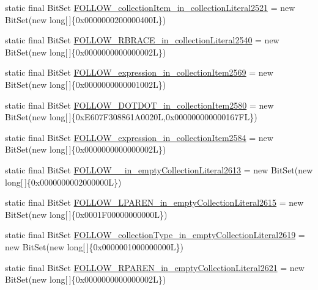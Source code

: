 \begin{DoxyCompactItemize}
static final Bit\-Set \hyperlink{classorg_1_1tzi_1_1use_1_1parser_1_1ocl_1_1_o_c_l_parser_a3ec9d882ee2519c44e78bc1fab0a7ae5}{F\-O\-L\-L\-O\-W\-\_\-collection\-Item\-\_\-in\-\_\-collection\-Literal2521} = new Bit\-Set(new long\mbox{[}$\,$\mbox{]}\{0x0000000200000400\-L\})
\item 
static final Bit\-Set \hyperlink{classorg_1_1tzi_1_1use_1_1parser_1_1ocl_1_1_o_c_l_parser_a4f970adb9c629bdc5afa0567d67b7e56}{F\-O\-L\-L\-O\-W\-\_\-\-R\-B\-R\-A\-C\-E\-\_\-in\-\_\-collection\-Literal2540} = new Bit\-Set(new long\mbox{[}$\,$\mbox{]}\{0x0000000000000002\-L\})
\item 
static final Bit\-Set \hyperlink{classorg_1_1tzi_1_1use_1_1parser_1_1ocl_1_1_o_c_l_parser_a97dc49876e7a98d9d75dd866e5f49544}{F\-O\-L\-L\-O\-W\-\_\-expression\-\_\-in\-\_\-collection\-Item2569} = new Bit\-Set(new long\mbox{[}$\,$\mbox{]}\{0x0000000000001002\-L\})
\item 
static final Bit\-Set \hyperlink{classorg_1_1tzi_1_1use_1_1parser_1_1ocl_1_1_o_c_l_parser_ad373478970fa2526ae58a8fd42229299}{F\-O\-L\-L\-O\-W\-\_\-\-D\-O\-T\-D\-O\-T\-\_\-in\-\_\-collection\-Item2580} = new Bit\-Set(new long\mbox{[}$\,$\mbox{]}\{0x\-E607\-F308861\-A0020\-L,0x000000000000167\-F\-L\})
\item 
static final Bit\-Set \hyperlink{classorg_1_1tzi_1_1use_1_1parser_1_1ocl_1_1_o_c_l_parser_a1097aa47b47c4700217b3dcf041016da}{F\-O\-L\-L\-O\-W\-\_\-expression\-\_\-in\-\_\-collection\-Item2584} = new Bit\-Set(new long\mbox{[}$\,$\mbox{]}\{0x0000000000000002\-L\})
\item 
static final Bit\-Set \hyperlink{classorg_1_1tzi_1_1use_1_1parser_1_1ocl_1_1_o_c_l_parser_ab88cf7f336e8fa13b52dcf9c990ad084}{F\-O\-L\-L\-O\-W\-\_\-\_\-in\-\_\-empty\-Collection\-Literal2613} = new Bit\-Set(new long\mbox{[}$\,$\mbox{]}\{0x0000000002000000\-L\})
\item 
static final Bit\-Set \hyperlink{classorg_1_1tzi_1_1use_1_1parser_1_1ocl_1_1_o_c_l_parser_a5e63623a359da64697bf26c93810a2e2}{F\-O\-L\-L\-O\-W\-\_\-\-L\-P\-A\-R\-E\-N\-\_\-in\-\_\-empty\-Collection\-Literal2615} = new Bit\-Set(new long\mbox{[}$\,$\mbox{]}\{0x0001\-F00000000000\-L\})
\item 
static final Bit\-Set \hyperlink{classorg_1_1tzi_1_1use_1_1parser_1_1ocl_1_1_o_c_l_parser_ad34dc679c97dff02e79c23dd2a26e98d}{F\-O\-L\-L\-O\-W\-\_\-collection\-Type\-\_\-in\-\_\-empty\-Collection\-Literal2619} = new Bit\-Set(new long\mbox{[}$\,$\mbox{]}\{0x0000001000000000\-L\})
\item 
static final Bit\-Set \hyperlink{classorg_1_1tzi_1_1use_1_1parser_1_1ocl_1_1_o_c_l_parser_aa4c05b855219f97d4d21bea53cd0a765}{F\-O\-L\-L\-O\-W\-\_\-\-R\-P\-A\-R\-E\-N\-\_\-in\-\_\-empty\-Collection\-Literal2621} = new Bit\-Set(new long\mbox{[}$\,$\mbox{]}\{0x0000000000000002\-L\})

\end{DoxyCompactItemize}
